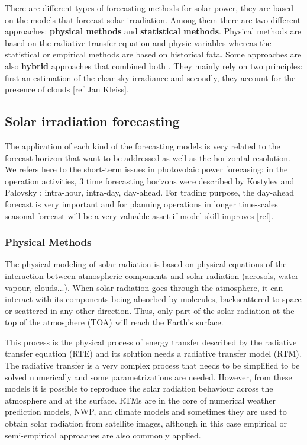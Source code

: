 There are different types of forecasting methods for solar power, they are based on the models that forecast solar irradiation. Among them there are two different approaches: \textbf{physical methods} and \textbf{statistical methods}. Physical methods are based on the radiative transfer equation and physic variables whereas the statistical or empirical methods are based on historical fata. Some approaches are also \textbf{hybrid} approaches that combined both \cite*{Diagne2013, Tovar-Pescador2008}. They mainly rely on two principles: first an estimation of the clear-sky irradiance and secondly, they account for the presence of clouds [ref Jan Kleiss].  


\subsection{Solar irradiation forecasting}

The application of each kind of the forecasting models is very related to the forecast horizon that want to be addressed as well as the horizontal resolution. We refers here to the short-term issues in photovolaic power forecasing: in the operation activities, 3 time forecasting horizons were described by Kostylev and Palovsky \cite*{kostylev2011solar}: intra-hour, intra-day, day-ahead. For trading purpose, the day-ahead forecast is very important and for planning operations in longer time-scales seasonal forecast will be a very valuable asset if model skill improves [ref]. 

\subsubsection{Physical Methods}

The physical modeling of solar radiation is based on physical equations of the interaction between atmospheric components and solar radiation (aerosols, water vapour, clouds...). When solar radiation goes through the atmosphere, it can interact with its components being absorbed by molecules, backscattered to space or scattered in any other direction. Thus, only part of the solar radiation at the top of the atmosphere (TOA) will reach the Earth's surface.

This process is the physical process of energy transfer described by the radiative transfer equation (RTE) and its solution needs a radiative transfer model (RTM). The radiative transfer is a very complex process that needs to be simplified to be solved numerically and some parametrizations are needed. However, from these models it is possible to reproduce the solar radiation behaviour across the atmosphere and at the surface. RTMs are in the core of numerical weather prediction models, NWP, and climate models and sometimes they are used to obtain solar radiation from satellite images, although in this case empirical or semi-empirical approaches are also commonly applied.

